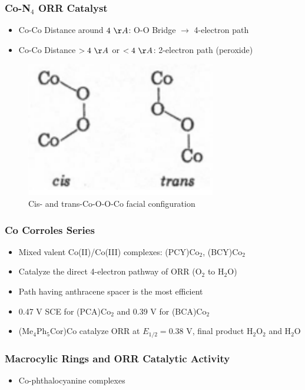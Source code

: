 \documentclass{beamer}
\begin{document}
\begin{frame}
\frametitle{Co-N$_4$ ORR Catalyst}

\begin{itemize}
\item{Co-Co Distance around $4 \ \AA$: O-O Bridge $\longrightarrow$ 4-electron path}
\item{Co-Co Distance  $ >4 \ \AA $ or $<4 \ \AA$: 2-electron path (peroxide)}
\end{itemize}

\begin{figure}[htbp]
    \begin{center}
    \includegraphics[scale=1]{image4}
    \caption{Cis- and trans-Co-O-O-Co facial configuration }
    \end{center}
\end{figure}
\end{frame}
\begin{frame}
\frametitle{Co Corroles Series}
\begin{itemize}
\item{Mixed valent Co(II)/Co(III) complexes: (PCY)Co$_2$, (BCY)Co$_2$}
\item{Catalyze the direct 4-electron pathway of ORR (O$_2$ to H$_2$O)}
\item{Path having \alert{anthracene spacer} is the most efficient \newline}
\item{0.47 V SCE for (PCA)Co$_2$ and 0.39 V for (BCA)Co$_2$}
\item{(Me$_4$Ph$_5$Cor)Co catalyze ORR at $E_{1/2} = 0.38$ V, final product H$_2$O$_2$ and H$_2$O}
\end{itemize}
\end{frame}
\begin{frame}
\frametitle{Macrocylic Rings and ORR Catalytic Activity}
\begin{itemize}
\item{Co-phthalocyanine complexes }
\end{itemize}
\end{frame}
\end{document}
